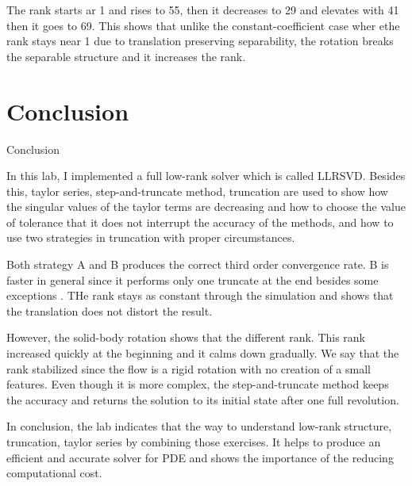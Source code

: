 \documentclass[11pt]{article}
\begin{document}
The rank starts ar 1 and rises to 55, then it decreases to 29 and elevates with 41 then it goes to 69. This shows that unlike the constant-coefficient case wher ethe rank stays near 1 due to translation preserving separability, the rotation breaks the separable structure and it increases the rank.


\section*{Conclusion}
{Conclusion}

In this lab, I implemented a full low-rank solver which is called LLRSVD. Besides this, taylor series, step-and-truncate method, truncation are used to show how the singular values of the taylor terms are decreasing and how to choose the value of tolerance that it does not interrupt the accuracy of the methods, and how to use two strategies in truncation with proper circumstances.

\vspace{2em}

Both strategy A and B produces the correct third order convergence rate. B is faster in general since it performs only one truncate at the end besides some exceptions . THe rank stays as constant through the simulation and shows that the translation does not distort the result. 

\vspace{2em}

However, the solid-body rotation shows that the different rank. This rank increased quickly at the beginning and it calms down gradually. We say that the rank stabilized since the flow is a rigid rotation with no creation of a small features. Even though it is more complex, the step-and-truncate method keeps the accuracy and returns the solution to its initial state after one full revolution. 

\vspace{2em}

In conclusion, the lab indicates that the way to understand low-rank structure, truncation, taylor series by combining those exercises. It helps to produce an efficient and accurate solver for PDE and shows the importance of the reducing computational cost. 

\end{document}
